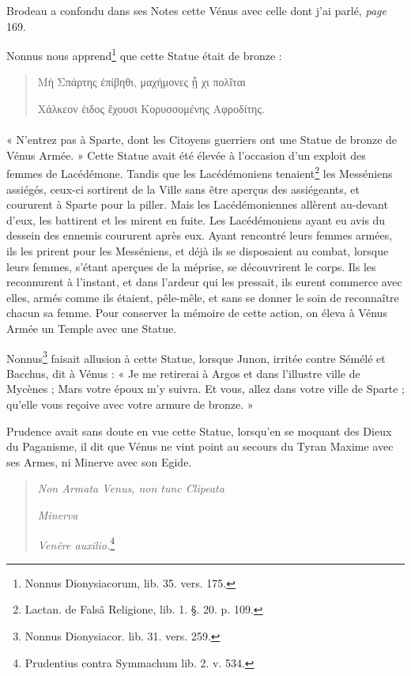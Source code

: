 \documentclass[a4paper, 18pt, oneside]{article}
\begin{document}
Brodeau a confondu dans ses Notes cette Vénus avec celle dont j'ai parlé, \emph{page} 169.

Nonnus nous apprend\footnote{Nonnus Dionysiacorum, lib. 35. vers. 175.} que cette Statue était de bronze :
\begin{quotation}
Μὴ Σπάρτης ἐπίβηθι, μαχήμονες ᾗ χι πολῖται

Χάλκεον ἐιδος ἔχουσι Κορυσσομένης Αφροδίτης.
\end{quotation}
\paragraph{}
« N'entrez pas à Sparte, dont les Citoyens guerriers ont une Statue de bronze de Vénus Armée. » Cette Statue avait été élevée à l'occasion d'un exploit des femmes de Lacédémone. Tandis que les Lacédémoniens tenaient\footnote{Lactan. de Falsâ Religione, lib. 1. §. 20. p. 109.} les Messéniens assiégés, ceux-ci sortirent de la Ville sans être aperçus des assiégeants, et coururent à Sparte pour la piller. Mais les Lacédémoniennes allèrent au-devant d'eux, les battirent et les mirent en fuite. Les Lacédémoniens ayant eu avis du dessein des ennemis coururent après eux. Ayant rencontré leurs femmes armées, ils les prirent pour les Messéniens, et déjà ils se disposaient au combat, lorsque leurs femmes, s'étant aperçues de la méprise, se découvrirent le corps. Ils les reconnurent à l'instant, et dans l'ardeur qui les pressait, ils eurent commerce avec elles, armés comme ils étaient, pêle-mêle, et sans se donner le soin de reconnaître chacun sa femme. Pour conserver la mémoire de cette action, on éleva à Vénus Armée un Temple avec une Statue.

Nonnus\footnote{Nonnus Dionysiacor. lib. 31. vers. 259.} faisait allusion à cette Statue, lorsque Junon, irritée contre Sémélé et Bacchus, dit à Vénus : « Je me retirerai à Argos et dans l'illustre ville de Mycènes ; Mars votre époux m'y suivra. Et vous, allez dans votre ville de Sparte ; qu'elle vous reçoive avec votre armure de bronze. »

Prudence avait sans doute en vue cette Statue, lorsqu'en se moquant des Dieux du Paganisme, il dit que Vénus ne vint point au secours du Tyran Maxime avec ses Armes, ni Minerve avec son Egide.
\begin{quotation}
\emph{Non Armata Venus, non tunc Clipeata}

\hspace*{5mm}\emph{Minerva}

\emph{Venêre auxilio.}\footnote{Prudentius contra Symmachum lib. 2. v. 534.}
\end{quotation}
\end{document}

